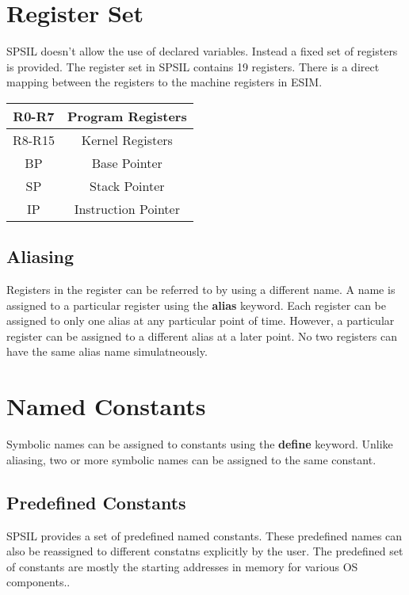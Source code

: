 \documentclass[11pt]{article}
\begin{document}
\section{Register Set}

SPSIL doesn't allow the use of declared variables. Instead a fixed set of registers is provided. The register set in SPSIL contains 19 registers. There is a direct mapping between the registers to the machine registers in ESIM.   \\

\begin{tabular}{| c | c | }
\hline
R0-R7 & Program Registers \\
\hline
R8-R15 & Kernel Registers \\
\hline
BP 		& Base Pointer \\
\hline
SP		& Stack Pointer \\
\hline
IP		& Instruction Pointer \\
\hline
\end{tabular}


\subsection{Aliasing}
Registers in the register can be referred to by using a different name. A name is assigned to a particular register using the \textbf{alias} keyword. Each register can be assigned to only one alias at any particular point of time. However, a particular register can be assigned to a different alias at a later point. No two registers can have the same alias name simulatneously.



\section{Named Constants}
Symbolic names can be assigned to constants using the \textbf{define} keyword. Unlike aliasing, two or more symbolic names can be assigned to the same constant. 
\subsection{Predefined Constants}
SPSIL provides a set of predefined named constants. These predefined names can also be reassigned to different constatns explicitly by the user. The predefined set of constants are mostly the starting addresses in memory for various OS components..
\end{document}

